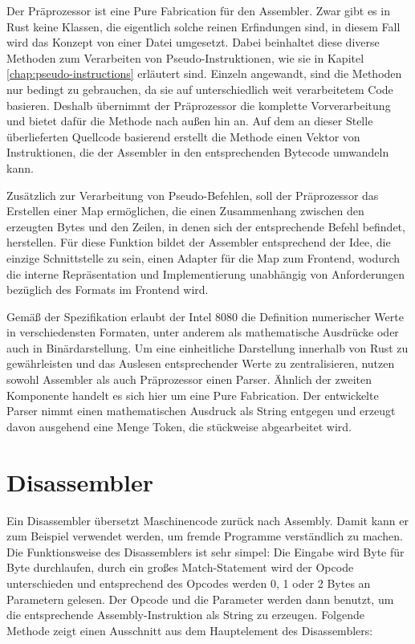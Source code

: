 Der Präprozessor ist eine \glqq Pure Fabrication\grqq{} für den Assembler. Zwar gibt es in Rust keine Klassen, die eigentlich solche reinen Erfindungen sind, in diesem Fall wird das Konzept von einer Datei umgesetzt. Dabei beinhaltet diese diverse Methoden zum Verarbeiten von Pseudo-Instruktionen, wie sie in Kapitel \ref{chap:pseudo-instructions} erläutert sind. Einzeln angewandt, sind die Methoden nur bedingt zu gebrauchen, da sie auf unterschiedlich weit verarbeitetem Code basieren. Deshalb übernimmt der Präprozessor die komplette Vorverarbeitung und bietet dafür die Methode  nach außen hin an. Auf dem an dieser Stelle überlieferten Quellcode basierend erstellt die Methode einen Vektor von Instruktionen, die der Assembler in den entsprechenden Bytecode umwandeln kann.

Zusätzlich zur Verarbeitung von Pseudo-Befehlen, soll der Präprozessor das Erstellen einer Map ermöglichen, die einen Zusammenhang zwischen den erzeugten Bytes und den Zeilen, in denen sich der entsprechende Befehl befindet, herstellen. Für diese Funktion bildet der Assembler entsprechend der Idee, die einzige Schnittstelle zu sein, einen Adapter für die Map zum Frontend, wodurch die interne Repräsentation und Implementierung unabhängig von Anforderungen bezüglich des Formats im Frontend wird.

Gemäß der Spezifikation erlaubt der Intel 8080 die Definition numerischer Werte in verschiedensten Formaten, unter anderem als mathematische Ausdrücke oder auch in Binärdarstellung. Um eine einheitliche Darstellung innerhalb von Rust zu gewährleisten und das Auslesen entsprechender Werte zu zentralisieren, nutzen sowohl Assembler als auch Präprozessor einen Parser. Ähnlich der zweiten Komponente handelt es sich hier um eine Pure Fabrication. Der entwickelte Parser nimmt einen mathematischen Ausdruck als String entgegen und erzeugt davon ausgehend eine Menge Token, die stückweise abgearbeitet wird.

\section{Disassembler}

Ein Disassembler übersetzt Maschinencode zurück nach Assembly. Damit kann er zum Beispiel verwendet werden, um fremde Programme verständlich zu machen.
Die Funktionsweise des Disassemblers ist sehr simpel: Die Eingabe wird Byte für Byte durchlaufen, durch ein großes Match-Statement wird der Opcode unterschieden und entsprechend des Opcodes werden 0, 1 oder 2 Bytes an Parametern gelesen. Der Opcode und die Parameter werden dann benutzt, um die entsprechende Assembly-Instruktion als String zu erzeugen. Folgende Methode zeigt einen Ausschnitt aus dem Hauptelement des Disassemblers:

